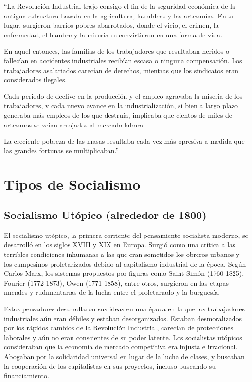\documentclass[
  jou,
  floatsintext,
  longtable,
  a4paper,
  nolmodern,
  notxfonts,
  notimes,
  12pt,
  colorlinks=true,linkcolor=blue,citecolor=blue,urlcolor=blue]{apa7}
\begin{document}
``La Revolución Industrial trajo consigo el fin de la seguridad
económica de la antigua estructura basada en la agricultura, las aldeas
y las artesanías. En su lugar, surgieron barrios pobres abarrotados,
donde el vicio, el crimen, la enfermedad, el hambre y la miseria se
convirtieron en una forma de vida.

En aquel entonces, las familias de los trabajadores que resultaban
heridos o fallecían en accidentes industriales recibían escasa o ninguna
compensación. Los trabajadores asalariados carecían de derechos,
mientras que los sindicatos eran considerados ilegales.

Cada periodo de declive en la producción y el empleo agravaba la miseria
de los trabajadores, y cada nuevo avance en la industrialización, si
bien a largo plazo generaba más empleos de los que destruía, implicaba
que cientos de miles de artesanos se veían arrojados al mercado laboral.

La creciente pobreza de las masas resultaba cada vez más opresiva a
medida que las grandes fortunas se multiplicaban.''

\section{Tipos de Socialismo}\label{tipos-de-socialismo}

\subsection{Socialismo Utópico (alrededor de
1800)}\label{socialismo-utuxf3pico-alrededor-de-1800}

El socialismo utópico, la primera corriente del pensamiento socialista
moderno, se desarrolló en los siglos XVIII y XIX en Europa. Surgió como
una crítica a las terribles condiciones inhumanas a las que eran
sometidos los obreros urbanos y los campesinos proletarizados debido al
capitalismo industrial de la época. Según Carlos Marx, los sistemas
propuestos por figuras como Saint-Simón (1760-1825), Fourier
(1772-1873), Owen (1771-1858), entre otros, surgieron en las etapas
iniciales y rudimentarias de la lucha entre el proletariado y la
burguesía.

Estos pensadores desarrollaron sus ideas en una época en la que los
trabajadores industriales aún eran débiles y estaban desorganizados.
Estaban desmoralizados por los rápidos cambios de la Revolución
Industrial, carecían de protecciones laborales y aún no eran conscientes
de su poder latente. Los socialistas utópicos consideraban que la
economía de mercado competitiva era injusta e irracional. Abogaban por
la solidaridad universal en lugar de la lucha de clases, y buscaban la
cooperación de los capitalistas en sus proyectos, incluso buscando su
financiamiento.
\end{document}
